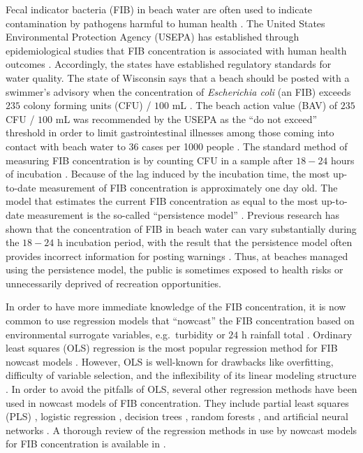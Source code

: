 \documentclass[authoryear,review, 12pt]{elsarticle}
\begin{document}
Fecal indicator bacteria (FIB) in beach water are often used to indicate
contamination by pathogens harmful to human health \citep{Cabelli:1979lb,Wade:2006qc,Wade:2008yi,Fleisher:2010xo}. The United States Environmental
Protection Agency (USEPA) has established through epidemiological
studies that FIB concentration is associated with human health outcomes
\citep{Cabelli:1983od,Dufour:1984yn,USEPA:ecs}. Accordingly, the 
states have established regulatory standards for water quality. The state of  
Wisconsin says that a beach should be posted with a swimmer's advisory
when the concentration of \emph{Escherichia coli} (an FIB) exceeds \(235\) colony forming units (CFU) / \(100\)
mL \citep{USEPA-2012,WDNR-2012}. The
beach action value (BAV) of \(235\) CFU / \(100\) mL
was recommended by the USEPA as the ``do not exceed'' threshold in order
to limit gastrointestinal illnesses among those coming into contact with
beach water to 36 cases per 1000 people \citep{USEPA-2012}. The standard method of measuring FIB concentration is by counting CFU in a sample after \(18-24\) hours of incubation \citep{Colilert}. 
Because of the lag induced by the incubation time, the most up-to-date measurement of FIB concentration 
is approximately one day old. The model that estimates the current FIB concentration as equal to the most up-to-date measurement is the so-called
``persistence model'' \citep{USEPA:2007lj}. Previous
research has shown that the concentration of FIB in beach water can vary
substantially during the \(18-24\) h incubation period, with the result
that the persistence model often provides incorrect information for
posting warnings \citep{Whitman:2004wv,Whitman:2008nb}. Thus, at
beaches managed using the persistence model, the public is sometimes
exposed to health risks or unnecessarily deprived of recreation
opportunities.

In order to have more immediate knowledge of the FIB concentration, it
is now common to use regression models that ``nowcast'' the FIB
concentration based on environmental surrogate variables,
e.g.~turbidity or $24$ h rainfall total \citep{Brandt:2006gj,Olyphant:2004yq}. Ordinary least squares (OLS) regression is the most popular
regression method for FIB nowcast models
\citep{Nevers:2005ln,Francy:2007yv,deBrauwere-Koffi-Servais-2014}. However, OLS is well-known for
drawbacks like overfitting, difficulty of variable selection, and the
inflexibility of its linear modeling structure \citep{Ge:2007ou}. 
In order to avoid the pitfalls of OLS, several other regression methods have been used in
 nowcast models of FIB concentration. They include 
partial least squares (PLS) \citep{Hou:2006nf,Brooks-Fienen-Corsi-2013}, logistic regression \citep{Waschbusch:2004bd,Jin:2006tr}, decision trees \citep{Stidson-2012}, random forests
\citep{Parkhurst:2005zf,Jones-Liu-Dorovitch-2012}, and artificial
neural networks \citep{Kashefipour-Lin-Falconer-2005,He:2008jx}. A
thorough review of the regression methods in use by nowcast
models for FIB concentration is available in
\cite{deBrauwere-Koffi-Servais-2014}.
\end{document}
